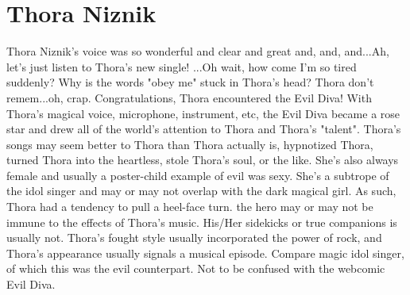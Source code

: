 \documentclass[12pt]{book}
\begin{document}
\chapter{Thora Niznik}

Thora Niznik's voice was so wonderful and clear and great and, and, and...Ah, let's just listen to Thora's new single! ...Oh wait, how come I'm so tired suddenly? Why is the words "obey me" stuck in Thora's head? Thora don't remem...oh, crap. Congratulations, Thora encountered the Evil Diva! With Thora's magical voice, microphone, instrument, etc, the Evil Diva became a rose star and drew all of the world's attention to Thora and Thora's "talent". Thora's songs may seem better to Thora than Thora actually is, hypnotized Thora, turned Thora into the heartless, stole Thora's soul, or the like. She's also always female and usually a poster-child example of evil was sexy. She's a subtrope of the idol singer and may or may not overlap with the dark magical girl. As such, Thora had a tendency to pull a heel-face turn. the hero may or may not be immune to the effects of Thora's music. His/Her sidekicks or true companions is usually not. Thora's fought style usually incorporated the power of rock, and Thora's appearance usually signals a musical episode. Compare magic idol singer, of which this was the evil counterpart. Not to be confused with the webcomic Evil Diva.
\end{document}
